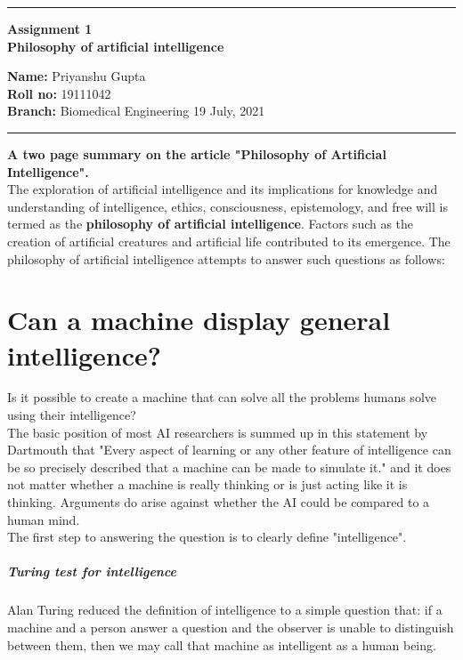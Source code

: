 \documentclass[10pt,a4paper,twoside]{article}
\begin{document}
\begin{center}
\hrule

\vspace{.3cm}
{\bf {\Large Assignment 1 }}\\
{\bf {\huge Philosophy of artificial intelligence}}
\vspace{.2cm}
\end{center}
{\bf Name:}  Priyanshu Gupta\\
{\bf Roll no:}  19111042 \\
{\bf Branch: }  Biomedical Engineering \hspace{\fill}  19 July, 2021 \\
\hrule

\vspace{.4cm}
{\textbf{\large A two page summary on the article "Philosophy of Artificial Intelligence".}} \\

The exploration of artificial intelligence and its implications for knowledge and understanding of intelligence, ethics, consciousness, epistemology, and free will is termed as the \textbf{\large{philosophy of artificial intelligence}}. Factors such as the creation of artificial creatures and artificial life contributed to its emergence. 
The philosophy of artificial intelligence attempts to answer such questions as follows: 

\section{Can a machine display general intelligence?}
Is it possible to create a machine that can solve all the problems humans solve using their intelligence?\\
 The basic position of most AI researchers is summed up in this statement by Dartmouth that "Every aspect of learning or any other feature of intelligence can be so precisely described that a machine can be made to simulate it." and it does not matter whether a machine is really thinking or is just acting like it is thinking. Arguments do arise against whether the AI could be compared to a human mind.\\ 
The first step to answering the question is to clearly define "intelligence".

\subparagraph{Turing test for intelligence}
Alan Turing reduced the definition of intelligence to a simple question that: if a machine and a person answer a question and the observer is unable to distinguish between them, then we may call that machine as intelligent as a human being.
\end{document}
